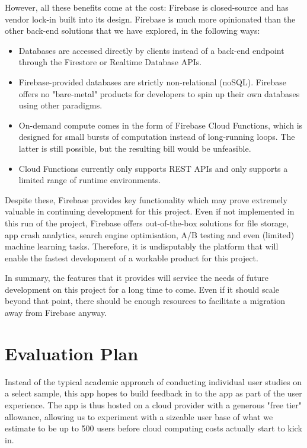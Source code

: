 However, all these benefits come at the cost: Firebase is closed-source and has vendor lock-in built into its design. Firebase is much more opinionated than the other back-end solutions that we have explored, in the following ways:

\begin{itemize}
    \item Databases are accessed directly by clients instead of a back-end endpoint through the Firestore or Realtime Database APIs.
    \item Firebase-provided databases are strictly non-relational (noSQL). Firebase offers no "bare-metal" products for developers to spin up their own databases using other paradigms.
    \item On-demand compute comes in the form of Firebase Cloud Functions, which is designed for small bursts of computation instead of long-running loops. The latter is still possible, but the resulting bill would be unfeasible.
    \item Cloud Functions currently only supports REST APIs and only supports a limited range of runtime environments.
\end{itemize}

Despite these, Firebase provides key functionality which may prove extremely valuable in continuing development for this project. Even if not implemented in this run of the project, Firebase offers out-of-the-box solutions for file storage, app crash analytics, search engine optimisation, A/B testing and even (limited) machine learning tasks. Therefore, it is undisputably the platform that will enable the fastest development of a workable product for this project.

In summary, the features that it provides will service the needs of future development on this project for a long time to come. Even if it should scale beyond that point, there should be enough resources to facilitate a migration away from Firebase anyway.

\section{Evaluation Plan}
Instead of the typical academic approach of conducting individual user studies on a select sample, this app hopes to build feedback in to the app as part of the user experience. The app is thus hosted on a cloud provider with a generous "free tier" allowance, allowing us to experiment with a sizeable user base of what we estimate to be up to 500 users before cloud computing costs actually start to kick in.


